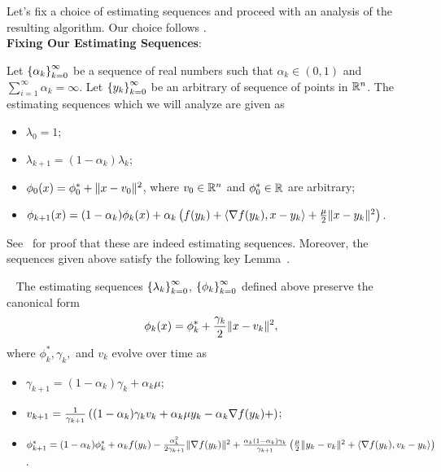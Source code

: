 Let's fix a choice of estimating sequences and proceed with an analysis of the resulting algorithm.
Our choice follows \citet{nesterov2004lectures}.\\

\textbf{Fixing Our Estimating Sequences}:

Let \( \left\{\alpha_k\right\}_{k=0}^\infty \) be a sequence of real numbers such that \( \alpha_k \in (0,1) \) and \( \sum_{i=1}^\infty \alpha_k = \infty \). Let \( \left\{y_k\right\}_{k=0}^\infty \) be an arbitrary of sequence of points in \( \mathbb{R}^n \).
The estimating sequences which we will analyze are given as
\begin{itemize}
    \item \( \lambda_0 = 1 \);
    \item \( \lambda_{k+1} = (1- \alpha_k) \lambda_k \);
    \item \( \phi_0(x) = \phi_0^* + \|x - v_0\|^2 \), where \( v_0 \in \mathbb{R}^n \) and \( \phi_0^* \in \mathbb{R} \) are arbitrary;
    \item \( \phi_{k+1}(x) = (1-\alpha_k) \phi_k(x) + \alpha_k \left( f(y_k) + \left\langle\nabla f(y_k), x - y_k\right\rangle + \frac{\mu}{2} \|x - y_k\|^2 \right) \).
\end{itemize}

See~\citet[Lemma 2.2.2]{nesterov2004lectures} for proof that these are indeed estimating sequences. Moreover, the sequences given above satisfy the following key Lemma~\cite[Lemma~2.2.3]{nesterov2004lectures}.\\

\begin{lemma}~\label{lemma:cannonical_form}
    The estimating sequences \( \left\{\lambda_k\right\}_{k=0}^\infty \), \( \left\{\phi_k\right\}_{k=0}^\infty \) defined above preserve the canonical form
    \[ \phi_{k}(x) = \phi_k^* + \frac{\gamma_k}{2}\|x - v_k\|^2, \]
    where \( \phi_k^*, \gamma_k, \) and \( v_k \) evolve over time as
    \begin{itemize}
        \item \( \gamma_{k+1} = (1-\alpha_k) \gamma_k + \alpha_k \mu \);
        \item \( v_{k+1} = \frac{1}{\gamma_{k+1}} \left( (1-\alpha_k) \gamma_k v_k + \alpha_k \mu y_k - \alpha_k \nabla f(y_k) + \right) \);
        \item \( \phi_{k+1}^* = (1- \alpha_k) \phi_k^* + \alpha_k f(y_k) - \frac{\alpha_k^2}{2\gamma_{k+1}}\|\nabla f(y_k)\|^2 + \frac{\alpha_k(1-\alpha_k)\gamma_k}{\gamma_{k+1}}\left(\frac{\mu}{2} \|y_k - v_k\|^2 + \left\langle\nabla f(y_k), v_k - y_k\right\rangle\right) \).
    \end{itemize}
\end{lemma}

